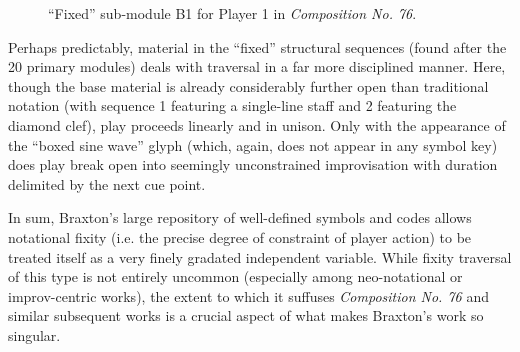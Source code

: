              \begin{figure} 
                \centering
                \captionsetup{width=.5\textwidth}
                \caption{``Fixed'' sub-module B1 for Player 1 in \textit{Composition No. 76}.}
                \label{fig:b1fixed}
            \end{figure} 



        Perhaps predictably, material in the ``fixed'' structural sequences (found after the 20 primary modules) deals with traversal in a far more disciplined manner. Here, though the base material is already considerably further open than traditional notation (with sequence 1 featuring a single-line staff and 2 featuring the diamond clef), play proceeds linearly and in unison. Only with the appearance of the ``boxed sine wave'' glyph (which, again, does not appear in any symbol key) does play break open into seemingly unconstrained improvisation with duration delimited by the next cue point.

        In sum, Braxton's large repository of well-defined symbols and codes allows notational fixity (i.e. the precise degree of constraint of player action) to be treated itself as a very finely gradated independent variable. While fixity traversal of this type is not entirely uncommon (especially among neo-notational or improv-centric works), the extent to which it suffuses \textit{Composition No. 76} and similar subsequent works is a crucial aspect of what makes Braxton's work so singular.

